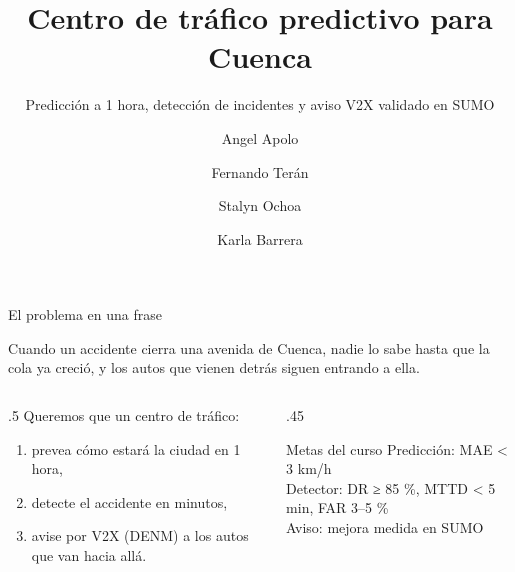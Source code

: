 \documentclass[aspectratio=169,10pt]{beamer}
\title{Centro de tráfico predictivo para Cuenca}
\subtitle{Predicción a 1 hora, detección de incidentes y aviso V2X validado en SUMO}
\author{Angel Apolo \and Fernando Terán \and Stalyn Ochoa \and Karla Barrera}
\institute{Redes Vehiculares · Proyecto Interciclo · Universidad de Cuenca}
\date{}
\begin{document}
\maketitle

\begin{frame}{El problema en una frase}
\vspace{4pt}
\begin{center}
{\Large Cuando un accidente cierra una avenida de Cuenca, \alert{nadie lo sabe hasta que la cola ya creció}, y los autos que vienen detrás siguen entrando a ella.}
\end{center}
\vspace{8pt}
\begin{columns}[T]
\begin{column}{.5\textwidth}
\small Queremos que un centro de tráfico:
\begin{enumerate}
\item \alert{prevea} cómo estará la ciudad en 1 hora,
\item \alert{detecte} el accidente en minutos,
\item \alert{avise} por V2X (DENM) a los autos que van hacia allá.
\end{enumerate}
\end{column}
\begin{column}{.45\textwidth}
\begin{block}{Metas del curso}
\small Predicción: MAE < 3 km/h\\
Detector: DR ≥ 85 \%, MTTD < 5 min, FAR 3–5 \%\\
Aviso: mejora medida en SUMO
\end{block}
\end{column}
\end{columns}
\end{frame}
\end{document}
